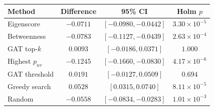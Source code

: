 \begin{tabular}{lccc}
\toprule
Method & Difference & 95\% CI & Holm $p$ \\
\midrule
Eigenscore & $-0.0711$ & $[-0.0980, -0.0442]$ & $3.30\times10^{-5}$ \\
Betweenness & $-0.0783$ & $[-0.1127, -0.0439]$ & $2.63\times10^{-4}$ \\
GAT top-$k$ & $0.0093$ & $[-0.0186, 0.0371]$ & $1.000$ \\
Highest $p_{uv}$ & $-0.1245$ & $[-0.1660, -0.0830]$ & $4.17\times10^{-6}$ \\
GAT threshold & $0.0191$ & $[-0.0127, 0.0509]$ & $0.694$ \\
Greedy search & $0.0528$ & $[0.0315, 0.0740]$ & $8.11\times10^{-5}$ \\
Random & $-0.0558$ & $[-0.0834, -0.0283]$ & $1.01\times10^{-3}$ \\
\bottomrule
\end{tabular}
